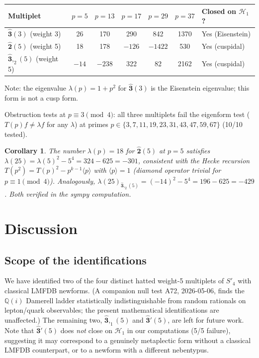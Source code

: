 \documentclass[12pt]{amsart}
\newtheorem{corollary}[theorem]{Corollary}
\theoremstyle{definition}
\newcommand{\Q}{\mathbb{Q}}
\newcommand{\hhat}[1]{\widehat{\mathbf{#1}}}  %
\newcommand{\HH}{\mathcal{H}_1}      %
\begin{document}
\begin{center}
\begin{tabular}{@{}lcccccl@{}}
  \toprule
  Multiplet & $p=5$ & $p=13$ & $p=17$ & $p=29$ & $p=37$ & Closed on $\HH$? \\
  \midrule
  $\hhat{3}(3)$ (weight 3) & 26 & 170 & 290 & 842  & 1370  & Yes (Eisenstein) \\
  $\hhat{2}(5)$ (weight 5) & 18 & 178 & $-126$ & $-1422$ & 530 & Yes (cuspidal) \\
  $\hhat{3},_2(5)$ (weight 5) & $-14$ & $-238$ & 322 & 82 & 2162 & Yes (cuspidal) \\
  \bottomrule
\end{tabular}
\end{center}

\medskip

\noindent
Note: the eigenvalue $\lambda(p) = 1 + p^2$ for $\hhat{3}(3)$
is the Eisenstein eigenvalue; this form is not a cusp form.

\medskip

Obstruction tests at $p\equiv 3\pmod{4}$:
all three multiplets fail the eigenform test ($T(p)f \neq \lambda f$
for any $\lambda$) at primes $p \in \{3, 7, 11, 19, 23, 31, 43, 47, 59, 67\}$
(10/10 tested).

\begin{corollary}
  The number $\lambda(p) = 18$ for $\hhat{2}(5)$ at $p=5$ satisfies
  $\lambda(25) = \lambda(5)^2 - 5^4 = 324 - 625 = -301$,
  consistent with the Hecke recursion
  $T(p^2) = T(p)^2 - p^{k-1}\langle p\rangle$ with $\langle p\rangle = 1$
  (diamond operator trivial for $p\equiv 1\pmod{4}$).
  Analogously, $\lambda(25)_{\hhat{3},_2(5)} = (-14)^2 - 5^4 = 196-625 = -429$.
  Both verified in the sympy computation.
\end{corollary}

\section{Discussion}
\label{sec:discussion}

\subsection{Scope of the identifications}

We have identified two of the four distinct hatted weight-5 multiplets
of $S'_4$ with classical LMFDB newforms.
(A companion null test A72, 2026-05-06, finds the $\Q(i)$ Damerell
ladder statistically indistinguishable from random rationals on
lepton/quark observables; the present mathematical identifications are
unaffected.)  The remaining two,
$\hhat{3},_1(5)$ and $\hhat{3}'(5)$, are left for future work.
Note that $\hhat{3}'(5)$ does \emph{not} close on $\HH$ in our
computations (5/5 failure), suggesting it may correspond to a
genuinely metaplectic form without a classical LMFDB counterpart,
or to a newform with a different nebentypus.
\end{document}
